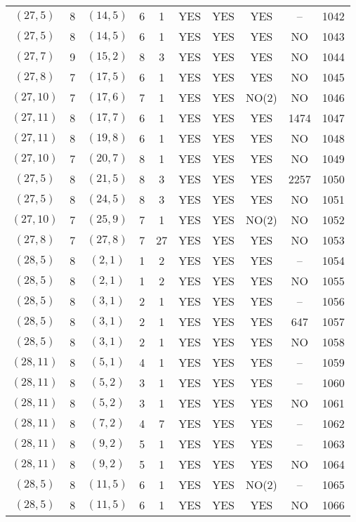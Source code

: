 \begin{longtable}{|c|c|c|c|c|c|c|c|c|c|}
$(27, 5)$ & 8 & $(14, 5)$ & 6 & 1 & YES & YES & YES & -- & 1042\\
$(27, 5)$ & 8 & $(14, 5)$ & 6 & 1 & YES & YES & YES & NO & 1043\\
$(27, 7)$ & 9 & $(15, 2)$ & 8 & 3 & YES & YES & YES & NO & 1044\\
$(27, 8)$ & 7 & $(17, 5)$ & 6 & 1 & YES & YES & YES & NO & 1045\\
$(27, 10)$ & 7 & $(17, 6)$ & 7 & 1 & YES & YES & NO(2) & NO & 1046\\
$(27, 11)$ & 8 & $(17, 7)$ & 6 & 1 & YES & YES & YES & 1474 & 1047\\
$(27, 11)$ & 8 & $(19, 8)$ & 6 & 1 & YES & YES & YES & NO & 1048\\
$(27, 10)$ & 7 & $(20, 7)$ & 8 & 1 & YES & YES & YES & NO & 1049\\
$(27, 5)$ & 8 & $(21, 5)$ & 8 & 3 & YES & YES & YES & 2257 & 1050\\
$(27, 5)$ & 8 & $(24, 5)$ & 8 & 3 & YES & YES & YES & NO & 1051\\
$(27, 10)$ & 7 & $(25, 9)$ & 7 & 1 & YES & YES & NO(2) & NO & 1052\\
$(27, 8)$ & 7 & $(27, 8)$ & 7 & 27 & YES & YES & YES & NO & 1053\\
$(28, 5)$ & 8 & $(2, 1)$ & 1 & 2 & YES & YES & YES & -- & 1054\\
$(28, 5)$ & 8 & $(2, 1)$ & 1 & 2 & YES & YES & YES & NO & 1055\\
$(28, 5)$ & 8 & $(3, 1)$ & 2 & 1 & YES & YES & YES & -- & 1056\\
$(28, 5)$ & 8 & $(3, 1)$ & 2 & 1 & YES & YES & YES & 647 & 1057\\
$(28, 5)$ & 8 & $(3, 1)$ & 2 & 1 & YES & YES & YES & NO & 1058\\
$(28, 11)$ & 8 & $(5, 1)$ & 4 & 1 & YES & YES & YES & -- & 1059\\
$(28, 11)$ & 8 & $(5, 2)$ & 3 & 1 & YES & YES & YES & -- & 1060\\
$(28, 11)$ & 8 & $(5, 2)$ & 3 & 1 & YES & YES & YES & NO & 1061\\
$(28, 11)$ & 8 & $(7, 2)$ & 4 & 7 & YES & YES & YES & -- & 1062\\
$(28, 11)$ & 8 & $(9, 2)$ & 5 & 1 & YES & YES & YES & -- & 1063\\
$(28, 11)$ & 8 & $(9, 2)$ & 5 & 1 & YES & YES & YES & NO & 1064\\
$(28, 5)$ & 8 & $(11, 5)$ & 6 & 1 & YES & YES & NO(2) & -- & 1065\\
$(28, 5)$ & 8 & $(11, 5)$ & 6 & 1 & YES & YES & YES & NO & 1066\\

\end{longtable}
